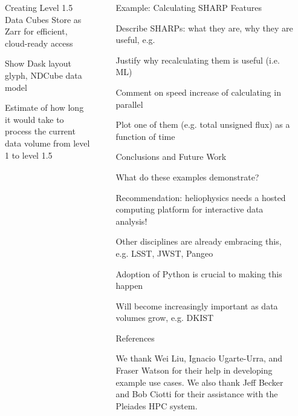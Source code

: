 \documentclass[final,12pt]{beamer}
\newlength{\sepwidth}
\newlength{\colwidth}
\newcommand{\separatorcolumn}{\begin{column}{\sepwidth}\end{column}}
\begin{document}
\begin{frame}[fragile,t]
\begin{columns}[t]
\begin{column}{\colwidth}
\begin{block}{Creating Level 1.5 Data Cubes}
    Store as Zarr for efficient, cloud-ready access

    Show Dask layout glyph, NDCube data model

    Estimate of how long it would take to process the current data volume from level 1 to level 1.5
  
  \end{block}

  
  

\end{column}

\separatorcolumn

\begin{column}{\colwidth}

  

  \begin{block}{Example: Calculating SHARP Features}

    Describe SHARPs: what they are, why they are useful, e.g. \citet{bobra_helioseismic_2014}

    Justify why recalculating them is useful (i.e. ML)

    Comment on speed increase of calculating in parallel

    Plot one of them (e.g. total unsigned flux) as a function of time

  \end{block}

  \begin{block}{Conclusions and Future Work}

    What do these examples demonstrate?

    Recommendation: heliophysics needs a hosted computing platform for interactive data analysis!

    Other disciplines are already embracing this, e.g. LSST, JWST, Pangeo

    Adoption of Python is crucial to making this happen 

    Will become increasingly important as data volumes grow, e.g. DKIST

  \end{block}

  \begin{block}{References}
    \scriptsize

    We thank Wei Liu, Ignacio Ugarte-Urra, and Fraser Watson for their help in developing example use cases. We also thank Jeff Becker and Bob Ciotti for their assistance with the Pleiades HPC system. 

      \begin{multicols}{2}
        
        
      \end{multicols}

  \end{block}

\end{column}

\separatorcolumn
\end{columns}
\end{frame}
\end{document}
